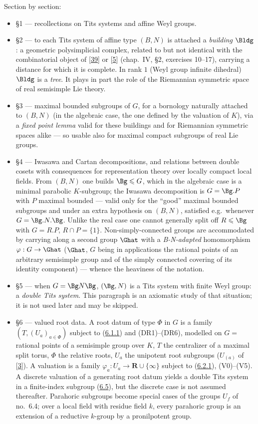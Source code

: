 \documentclass[12pt,a4paper,oneside,english]{smfart}
\newcommand{\btref}[1]{\hyperlink{bt:#1}{#1}}
\newcommand{\btbib}[1]{\hyperlink{bib:#1}{#1}}
\theoremstyle{definition}
\theoremstyle{bt}
\begin{document}
Section by section:
\begin{itemize}[leftmargin=1.6em,itemsep=2pt]
\item \S1 --- recollections on Tits systems and affine Weyl groups.
\item \S2 --- to each Tits system of affine type $(B,N)$ is attached a
  \emph{building} $\Bldg$: a geometric polysimplicial complex, related to but
  not identical with the combinatorial object of [\btbib{39}] or [\btbib{5}] (chap.~IV, \S2,   exercises 10--17), carrying a distance for which it is complete. In rank $1$   (Weyl group infinite dihedral) $\Bldg$ is a \emph{tree}. It plays in part   the role of the Riemannian symmetric space of real semisimple Lie theory.
\item \S3 --- maximal bounded subgroups of $G$, for a bornology naturally
  attached to $(B,N)$ (in the algebraic case, the one defined by the valuation   of $K$), via a \emph{fixed point lemma} valid for these buildings and for   Riemannian symmetric spaces alike --- so usable also for maximal compact   subgroups of real Lie groups.
\item \S4 --- Iwasawa and Cartan decompositions, and relations between double
  cosets with consequences for representation theory over locally compact   local fields. From $(B,N)$ one builds $\Bg\leqslant G$, which in the   algebraic case is a minimal parabolic $K$-subgroup; the Iwasawa   decomposition is $G=\Bg.P$ with $P$ maximal bounded --- valid only for the   ``good'' maximal bounded subgroups and under an extra hypothesis on   $(B,N)$, satisfied e.g.\ whenever $G=\Bg.N.\Bg$. Unlike the real case one   cannot generally split off $R\leqslant\Bg$ with $G=R.P$, $R\cap P=\{1\}$.   Non-simply-connected groups are accommodated by carrying along a second   group $\Ghat$ with a \emph{B-N-adapted} homomorphism   $\varphi:G\rightarrow\Ghat$ ($\Ghat$, $G$ being in applications the rational   points of an arbitrary semisimple group and of the simply connected covering   of its identity component) --- whence the heaviness of the notation.
\item \S5 --- when $G=\Bg N\Bg$, $(\Bg,N)$ is a Tits system with finite Weyl
  group: a \emph{double Tits system}. This paragraph is an axiomatic study of   that situation; it is not used later and may be skipped.
\item \S6 --- valued root data. A root datum of type $\Phi$ in $G$ is a family
  $(T,(U_a)_{a\in\Phi})$ subject to (\btref{6.1.1}) and (DR1)--(DR6), modelled on   $G=$ rational points of a semisimple group over $K$, $T$ the centralizer of   a maximal split torus, $\Phi$ the relative roots, $U_a$ the unipotent root   subgroups ($U_{(a)}$ of [\btbib{3}]). A valuation is a family   $\varphi_a:U_a\rightarrow\mathbf{R}\cup\{\infty\}$ subject to (\btref{6.2.1}),   (V0)--(V5). A discrete valuation of a generating root datum yields a double   Tits system in a finite-index subgroup (\btref{6.5}), but the discrete case is not   assumed thereafter. Parahoric subgroups become special cases of the groups   $U_f$ of no.~6.4; over a local field with residue field $k$, every parahoric   group is an extension of a reductive $k$-group by a pronilpotent group.

\end{itemize}
\end{document}
